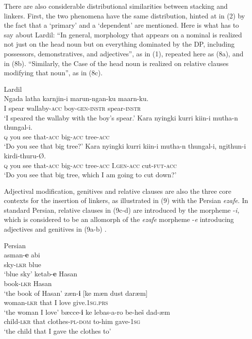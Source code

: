 \documentclass[output=paper]{langsci/langscibook}
\begin{document}
  There are also considerable distributional similarities between stacking and linkers. First, the two phenomena have the same distribution, hinted at in (2) by the fact that a ‘primary’ and a ‘dependent’ are mentioned. Here is what \citet[46--47]{Richards2013} has to say about Lardil: “In general, morphology that appears on a nominal is realized not just on the head noun but on everything dominated by the DP, including possessors, demonstratives, and adjectives”, as in (1), repeated here as (8a), and in (8b). “Similarly, the Case of the head noun is realized on relative clauses modifying that noun”, as in (8c).  

\ea%
    Lardil  \citep[47]{Richards2013}\label{ex:manzini:8}\\
    \ea
    \gll Ngada latha   karnjin-i   marun-ngan-ku   maarn-ku.     \\
         I   spear   wallaby-\textsc{acc} boy-\textsc{gen-instr}  spear-\textsc{instr} \\
    \glt ‘I speared the wallaby with the boy’s spear.’
    \ex
    \gll Kara   nyingki   kurri   kiin-i     mutha-n   thungal-i. \\
         \textsc{q}    you     see   that-\textsc{acc}    big-\textsc{acc}    tree\textsc{{}-acc} \\
    \glt ‘Do you see that big tree?’
    \ex
    \gll Kara   nyingki kurri kiin-i     mutha-n thungal-i,   ngithun-i kirdi-thuru-Ø. \\
         \textsc{q}  you     see   that-\textsc{acc}    big-\textsc{acc}   tree-\textsc{acc}    I.\textsc{gen-acc}  cut-\textsc{fut-acc} \\
    \glt ‘Do you see that big tree, which I am going to cut down?’
    \z
\z

Adjectival modification, genitives and relative clauses are also the three core contexts for the insertion of linkers, as illustrated in (9) with the Persian \textit{ezafe}. In standard Persian, relative clauses in (9c-d) are introduced by the morpheme -\textit{i,} which is considered to be an allomorph of the \textit{ezafe} morpheme -\textit{e} introducing adjectives and genitives in (9a-b) \citep{Samvelian2007}.

\ea%
    Persian\label{ex:manzini:9}\\
    \ea
    \gll asman-\textbf{e}   abi     \\
         sky-\textsc{lkr}    blue\\
    \glt ‘blue sky’        
    \ex  
    \gll ketab-\textbf{e}   Hasan   \\
         book-\textsc{lkr}    Hasan\\
    \glt ‘the book of Hasan’ 
    \ex  
    \gll zæn-\textbf{i}     [ke  mæn  dust  daræm]\\
         woman-\textsc{lkr}   that   I   love  give.\textsc{1sg.prs}\\
    \glt ‘the woman I love’
    \ex
    \gll bæcce-\textbf{i}   ke   lebas-a-ro     be-heš dad-æm\\
         child-\textsc{lkr}    that   clothes-\textsc{pl-dom}    to-him gave-\textsc{1sg} \\
    \glt ‘the child that I gave the clothes to’
    \z
\z
\end{document}

